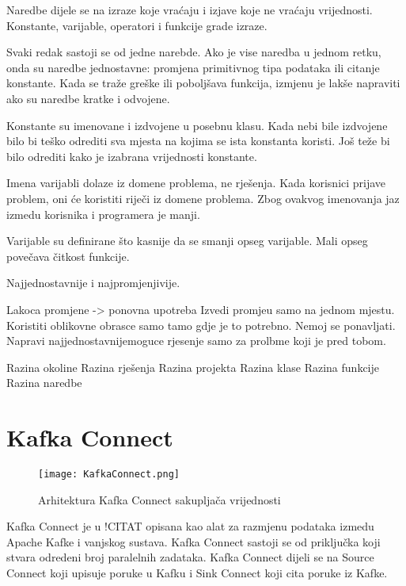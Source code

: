 \documentclass[times, utf8, diplomski, numeric]{fer}
\begin{document}
Naredbe dijele se na izraze koje vraćaju i izjave koje ne vraćaju vrijednosti. Konstante, varijable, operatori i funkcije grade izraze.

Svaki redak sastoji se od jedne narebde. Ako je vise naredba u jednom retku, onda su naredbe jednostavne: promjena primitivnog tipa podataka ili citanje konstante. Kada se traže greške ili poboljšava funkcija, izmjenu je lakše napraviti ako su naredbe kratke i odvojene.

Konstante su imenovane i izdvojene u posebnu klasu. Kada nebi bile izdvojene bilo bi teško odrediti sva mjesta na kojima se ista konstanta koristi. Još teže bi bilo odrediti kako je izabrana vrijednosti konstante.

Imena varijabli dolaze iz domene problema, ne rješenja. Kada korisnici prijave problem, oni će koristiti riječi iz domene problema. Zbog ovakvog imenovanja jaz izmedu korisnika i programera je manji.

Varijable su definirane što kasnije da se smanji opseg varijable. Mali opseg povečava čitkost funkcije.









Najjednostavnije i najpromjenjivije.

Lakoca promjene -> ponovna upotreba
Izvedi promjeu samo na jednom mjestu.
Koristiti oblikovne obrasce samo tamo gdje je to potrebno.
Nemoj se ponavljati.
Napravi najjednostavnijemoguce rjesenje samo za prolbme koji je pred tobom.

Razina okoline
Razina rješenja
Razina projekta
Razina klase
Razina funkcije
Razina naredbe

\section{Kafka Connect}

\begin{figure}[H]
    \centering
    \texttt{[image: KafkaConnect.png]}
    \caption{Arhitektura Kafka Connect sakupljača vrijednosti}
    \label{fig:kafka-connect}
\end{figure}

Kafka Connect je u !CITAT opisana kao alat za razmjenu podataka izmedu Apache Kafke i vanjskog sustava. Kafka Connect sastoji se od priključka koji stvara odredeni broj paralelnih zadataka. Kafka Connect dijeli se na Source Connect koji upisuje poruke u Kafku i Sink Connect koji cita poruke iz Kafke.
\end{document}
